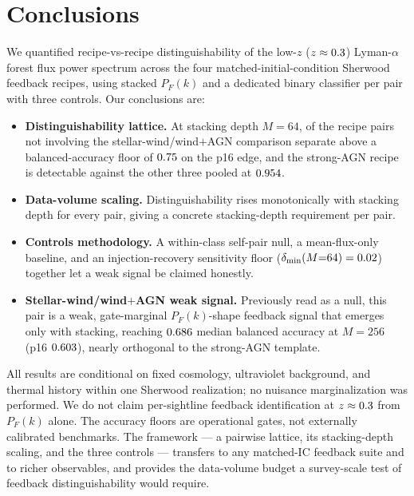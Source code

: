 \section{Conclusions}
\label{sec:conclusions}

We quantified recipe-vs-recipe distinguishability of the low-$z$
($z\approx0.3$) Lyman-$\alpha$ forest flux power spectrum across the four
matched-initial-condition Sherwood feedback recipes, using stacked $P_F(k)$ and a
dedicated binary classifier per pair with three controls. Our conclusions are:

\begin{itemize}
  \item \textbf{Distinguishability lattice.} At stacking depth $M=64$,
        \latClearedTotal{} of the \latClearedTotal{} recipe pairs not involving
        the stellar-wind/wind${+}$AGN comparison separate above a balanced-accuracy
        floor of $0.75$ on the p16 edge, and the strong-AGN recipe is
        detectable against the other three pooled at $0.954$.
  \item \textbf{Data-volume scaling.} Distinguishability rises monotonically with
        stacking depth for every pair, giving a concrete stacking-depth
        requirement per pair.
  \item \textbf{Controls methodology.} A within-class self-pair null, a
        mean-flux-only baseline, and an injection-recovery sensitivity floor
        ($\delta_\mathrm{min}(M{=}64)=0.02$) together let a weak signal
        be claimed honestly.
  \item \textbf{Stellar-wind/wind${+}$AGN weak signal.} Previously read as a null,
        this pair is a weak, gate-marginal $P_F(k)$-shape feedback signal that
        emerges only with stacking, reaching $0.686$ median balanced
        accuracy at $M=256$ (p16 $0.603$), nearly orthogonal to
        the strong-AGN template.
\end{itemize}

All results are conditional on fixed cosmology, ultraviolet background, and
thermal history within one Sherwood realization; no nuisance marginalization was
performed. We do not claim per-sightline feedback identification at
$z\approx0.3$ from $P_F(k)$ alone. The accuracy floors are operational gates,
not externally calibrated benchmarks. The framework --- a pairwise lattice, its
stacking-depth scaling, and the three controls --- transfers to any matched-IC
feedback suite and to richer observables, and provides the data-volume budget a
survey-scale test of feedback distinguishability would require.
